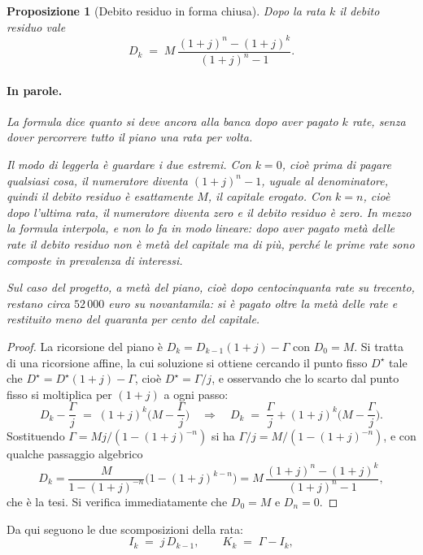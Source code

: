 \documentclass[11pt,a4paper]{article}
\theoremstyle{definition}
\theoremstyle{plain}
\newtheorem{proposizione}[definizione]{Proposizione}
\begin{document}
\begin{proposizione}[Debito residuo in forma chiusa]
Dopo la rata $k$ il debito residuo vale
\begin{equation}
D_k \;=\; M\,\frac{(1+j)^n - (1+j)^k}{(1+j)^n - 1} .
\label{eq:residuo}
\end{equation}

\paragraph{In parole.} La formula dice quanto si deve ancora alla banca dopo aver pagato $k$ rate, senza dover percorrere tutto il piano una rata per volta.

Il modo di leggerla è guardare i due estremi. Con $k=0$, cioè prima di pagare qualsiasi cosa, il numeratore diventa $(1+j)^n - 1$, uguale al denominatore, quindi il debito residuo è esattamente $M$, il capitale erogato. Con $k=n$, cioè dopo l'ultima rata, il numeratore diventa zero e il debito residuo è zero. In mezzo la formula interpola, e non lo fa in modo lineare: dopo aver pagato metà delle rate il debito residuo non è metà del capitale ma di più, perché le prime rate sono composte in prevalenza di interessi.

Sul caso del progetto, a metà del piano, cioè dopo centocinquanta rate su trecento, restano circa $52\,000$ euro su novantamila: si è pagato oltre la metà delle rate e restituito meno del quaranta per cento del capitale.
\end{proposizione}

\begin{proof}
La ricorsione del piano è $D_k = D_{k-1}(1+j) - \Gamma$ con $D_0 = M$. Si tratta di una ricorsione affine, la cui soluzione si ottiene cercando il punto fisso $D^\star$ tale che $D^\star = D^\star(1+j)-\Gamma$, cioè $D^\star = \Gamma/j$, e osservando che lo scarto dal punto fisso si moltiplica per $(1+j)$ a ogni passo:
\[
D_k - \frac{\Gamma}{j} \;=\; (1+j)^k\Big(M - \frac{\Gamma}{j}\Big)
\quad\Longrightarrow\quad
D_k \;=\; \frac{\Gamma}{j} + (1+j)^k\Big(M-\frac{\Gamma}{j}\Big).
\]
Sostituendo $\Gamma = Mj/(1-(1+j)^{-n})$ si ha $\Gamma/j = M/(1-(1+j)^{-n})$, e con qualche passaggio algebrico
\[
D_k = \frac{M}{1-(1+j)^{-n}}\Big(1-(1+j)^{k-n}\Big)
= M\,\frac{(1+j)^n-(1+j)^k}{(1+j)^n-1},
\]
che è la tesi. Si verifica immediatamente che $D_0 = M$ e $D_n = 0$.
\end{proof}

Da qui seguono le due scomposizioni della rata:
\begin{equation}
I_k \;=\; j\,D_{k-1}, \qquad K_k \;=\; \Gamma - I_k,
\label{eq:scomposizione}
\end{equation}
\end{document}
